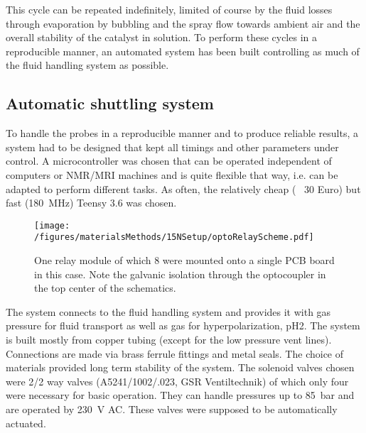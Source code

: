             This cycle can be repeated indefinitely, limited of course by the fluid losses through evaporation by bubbling and the spray flow towards ambient air and the overall stability of the catalyst in solution. 
            To perform these cycles in a reproducible manner, an automated system has been built controlling as much of the fluid handling system as possible.
        \subsection{Automatic shuttling system}
    To handle the probes in a reproducible manner and to produce reliable results, a system had to be designed that kept all timings and other parameters under control. A microcontroller was chosen that can be operated independent of computers or NMR/MRI machines and is quite flexible that way, i.e. can be adapted to perform different tasks. As often, the relatively cheap (~ 30 Euro) but fast (\SI{180}{\mega\hertz}) Teensy 3.6 was chosen.
            \begin{wrapfigure}{rb}{0.6\textwidth}
                \texttt{[image: /figures/materialsMethods/15NSetup/optoRelayScheme.pdf]}
                \caption[Relay schematics]{One relay module of which 8 were mounted onto a single PCB board in this case. Note the galvanic isolation through the optocoupler in the top center of the schematics.}
                \label{fig:materialsMethods:relaySchematics}
            \end{wrapfigure}
            The system connects to the fluid handling system and provides it with gas pressure for fluid transport as well as gas for hyperpolarization, pH2. The system is built mostly from copper tubing (except for the low pressure vent lines). Connections are made via brass ferrule fittings and metal seals. The choice of materials provided long term stability of the system. The solenoid valves chosen were 2/2 way valves (A5241/1002/.023, GSR Ventiltechnik) of which only four were necessary for basic operation. They can handle pressures up to \SI{85}{\bar} and are operated by \SI{230}{\volt} AC. These valves were supposed to be automatically actuated.
